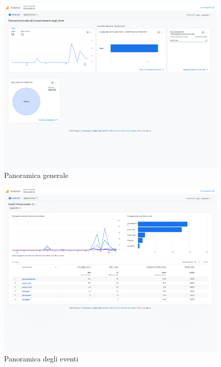 \begin{figure}[H]
    \centering
    \includegraphics[width=0.99\textwidth]{Immagini/Alexandria/Report/panoramica-1.png}
    \caption{Panoramica generale}
\end{figure}

\begin{figure}[H]
    \centering
    \includegraphics[width=0.99\textwidth]{Immagini/Alexandria/Report/eventi-1.png}
    \caption{Panoramica degli eventi}
\end{figure}

